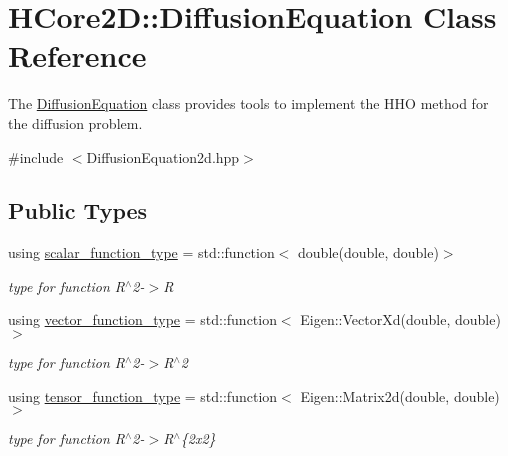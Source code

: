 \hypertarget{classHCore2D_1_1DiffusionEquation}{}\section{H\+Core2D\+:\+:Diffusion\+Equation Class Reference}
\label{classHCore2D_1_1DiffusionEquation}


The \hyperlink{classHCore2D_1_1DiffusionEquation}{Diffusion\+Equation} class provides tools to implement the H\+HO method for the diffusion problem.  




{\ttfamily \#include $<$Diffusion\+Equation2d.\+hpp$>$}

\subsection*{Public Types}
\begin{DoxyCompactItemize}
\item 
\mbox{\label{classHCore2D_1_1DiffusionEquation_a4d7604bc4b5cef6bf1af81a8cbad6148}} 
using \hyperlink{classHCore2D_1_1DiffusionEquation_a4d7604bc4b5cef6bf1af81a8cbad6148}{scalar\+\_\+function\+\_\+type} = std\+::function$<$ double(double, double)$>$
\begin{DoxyCompactList}\small\item\em type for function R$^\wedge$2-\/$>$R \end{DoxyCompactList}\item 
\mbox{\label{classHCore2D_1_1DiffusionEquation_a49610b0cb502efcaa1cafc7bf72f7567}} 
using \hyperlink{classHCore2D_1_1DiffusionEquation_a49610b0cb502efcaa1cafc7bf72f7567}{vector\+\_\+function\+\_\+type} = std\+::function$<$ Eigen\+::\+Vector\+Xd(double, double)$>$
\begin{DoxyCompactList}\small\item\em type for function R$^\wedge$2-\/$>$R$^\wedge$2 \end{DoxyCompactList}\item 
\mbox{\label{classHCore2D_1_1DiffusionEquation_a1bd8e4bd048ad03f26c2bf2118c671c4}} 
using \hyperlink{classHCore2D_1_1DiffusionEquation_a1bd8e4bd048ad03f26c2bf2118c671c4}{tensor\+\_\+function\+\_\+type} = std\+::function$<$ Eigen\+::\+Matrix2d(double, double)$>$
\begin{DoxyCompactList}\small\item\em type for function R$^\wedge$2-\/$>$R$^\wedge$\{2x2\} \end{DoxyCompactList}\end{DoxyCompactItemize}
